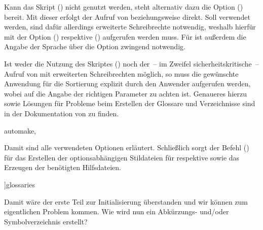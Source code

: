 \documentclass[%
  english,ngerman,%
  cdgeometry=no,DIV=12,%
  cd=false,cdfont=false,cdtitle=true,%
  headings=normal,%
  automark,%
  listof=toc,%
]{tudscrartcl}
\begin{document}

Kann das Skript () nicht genutzt 
werden, steht alternativ dazu die Option ()
bereit. Mit dieser erfolgt der Aufruf von  beziehungsweise 
 direkt. Soll  verwendet werden, sind 
dafür allerdings erweiterte Schreibrechte notwendig, weshalb  
hierfür mit der Option () respektive 
() aufgerufen werden muss. Für 
 ist außerdem die Angabe der Sprache über die Option 
 zwingend notwendig. 

Ist weder die Nutzung des Skriptes () 
noch der~-- im Zweifel sicherheitskritische~-- Aufruf von  mit 
erweiterten Schreibrechten möglich, so muss die gewünschte Anwendung für die 
Sortierung explizit durch den Anwender aufgerufen werden, wobei auf die Angabe 
der richtigen Parameter zu achten ist. Genaueres hierzu sowie Lösungen für 
Probleme beim Erstellen der Glossare und Verzeichnisse sind in der Dokumentation
von  zu finden.
%
\begin{Hint}
  automake,%
\end{Hint}
%
Damit sind alle verwendeten Optionen erläutert. Schließlich sorgt der Befehl 
() für das Erstellen der 
optionsabhängigen Stildateien für  respektive 
 sowie das Erzeugen der benötigten Hilfsdateien.
%
\begin{Preamble}
]{glossaries}
\makeglossaries

\end{Preamble}
%
Damit wäre der erste Teil zur Initialisierung überstanden und wir können zum 
eigentlichen Problem kommen. Wie wird nun ein Abkürzungs- und/oder 
Symbolverzeichnis erstellt?
\end{document}
